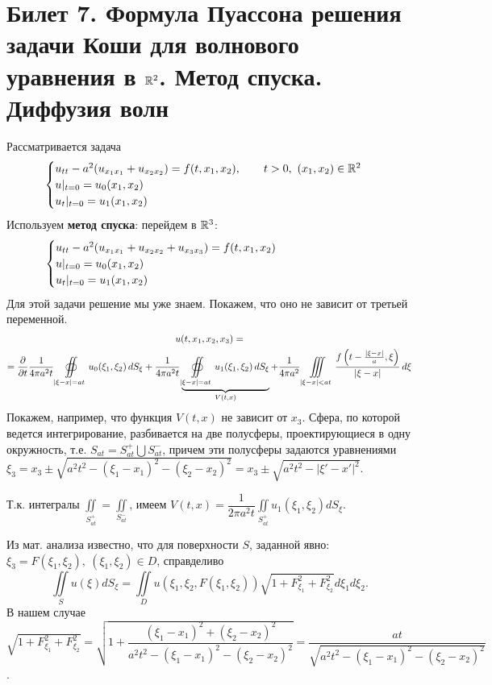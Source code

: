 \documentclass[../main.tex]{subfiles}
\begin{document}
\section{Билет 7. Формула Пуассона решения задачи Коши для волнового уравнения в \texorpdfstring{$\mathbb{R}^2$}{R\textasciicircum 2}. Метод спуска. Диффузия волн}
Рассматривается задача
\begin{equation}
\label{eq::7::cauchy}
\begin{cases}
  u_{tt}-a^2(u_{x_1x_1}+u_{x_2x_2})=f(t,x_1,x_2),\qquad t>0,\ (x_1, x_2)\in \mathbb{R}^2\\
  u|_{t=0}=u_0(x_1, x_2)\\ 
  u_t|_{t=0}=u_1(x_1, x_2)
\end{cases}
\end{equation}
Используем \textbf{метод спуска}: перейдем в $\mathbb{R}^3$:
\begin{equation*}
\begin{cases}
  u_{tt}-a^2(u_{x_1x_1}+u_{x_2x_2}+u_{x_3x_3})=f(t,x_1,x_2) \hspace{7.5em}\\
  u|_{t=0}=u_0(x_1, x_2)\\
  u_t|_{t=0}=u_1(x_1, x_2)
\end{cases}
\end{equation*}
Для этой задачи решение мы уже знаем. Покажем, что оно не зависит от третьей переменной.
\begin{multline*}
u(t, x_1, x_2, x_3) = \\
= \frac{\partial }{\partial t} \frac{1}{4\pi a^2t} \oiint\limits_{|\xi-x|=at} u_0(\xi_1, \xi_2)\, dS_\xi 
+\frac{1}{4\pi a^2t}\underbrace{\oiint\limits_{|\xi-x|=at} u_1(\xi_1, \xi_2)\, dS_{\xi}}_{V(t,x)}
+\frac{1}{4\pi a^2}\iiint\limits_{|\xi - x|<at}\frac{f\left(t-\frac{|\xi - x|}{a}, \xi \right)}{|\xi - x|}\, d\xi
\end{multline*}
Покажем, например, что функция $V(t,x)$ не зависит от $x_3$.
Сфера, по которой ведется интегрирование, разбивается на две полусферы, проектирующиеся в одну окружность, т.е. $S_{at}=S_{at}^+\bigcup S_{at}^-$, причем эти полусферы задаются уравнениями $\xi_3=x_3\pm \sqrt{a^2t^2-(\xi_1 -x_1)^2-(\xi_2 -x_2)^2}=x_3\pm \sqrt{a^2t^2-|\xi '-x'|^2}$.

Т.к. интегралы $\displaystyle\iint\limits_{S_{at}^+}=\iint\limits_{S_{at}^-}$, имеем $V(t,x)=\dfrac{1}{2\pi a^2t}\displaystyle\iint\limits_{S_{at}^+}u_1(\xi_1, \xi_2)dS_{\xi}$.

Из мат. анализа известно, что для поверхности $S$, заданной явно: $\xi_3=F(\xi_1, \xi_2),\ (\xi_1, \xi_2)\in D$, справделиво 
\[
\iint\limits_S u(\xi )dS_{\xi}=\iint\limits_D u\left( \xi_1, \xi_2, F(\xi_1, \xi_2)\right)\sqrt{1+F_{\xi_1}^2+F_{\xi_2}^2}d\xi_1d\xi_2.
\]
В нашем случае $\sqrt{1+F_{\xi_1}^2+F_{\xi_2}^2}=\sqrt{1+\dfrac{(\xi_1 - x_1)^2+(\xi_2 - x_2)^2}{a^2t^2 - (\xi_1 - x_1)^2-(\xi_2 - x_2)^2}}=\dfrac{at}{\sqrt{a^2t^2 - (\xi_1 - x_1)^2-(\xi_2 - x_2)^2}}$.
\end{document}

